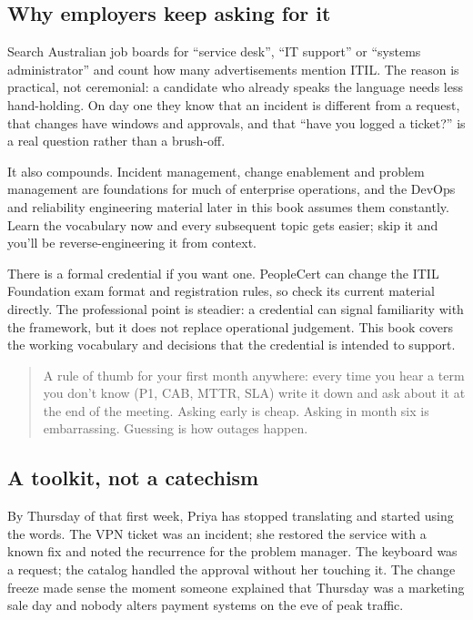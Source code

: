 \subsection{Why employers keep asking for it}


Search Australian job boards for ``service desk'', ``IT support'' or ``systems administrator'' and count how many advertisements mention ITIL. The reason is practical, not ceremonial: a candidate who already speaks the language needs less hand-holding. On day one they know that an incident is different from a request, that changes have windows and approvals, and that ``have you logged a ticket?'' is a real question rather than a brush-off.


It also compounds. Incident management, change enablement and problem management are foundations for much of enterprise operations, and the DevOps and reliability engineering material later in this book assumes them constantly. Learn the vocabulary now and every subsequent topic gets easier; skip it and you'll be reverse-engineering it from context.


There is a formal credential if you want one. PeopleCert can change the ITIL Foundation exam format and registration rules, so check its current material directly. The professional point is steadier: a credential can signal familiarity with the framework, but it does not replace operational judgement. This book covers the working vocabulary and decisions that the credential is intended to support. \autocite{peoplecert-itil4}



\begin{quote}\small
A rule of thumb for your first month anywhere: every time you hear a term you don't know (P1, CAB, MTTR, SLA) write it down and ask about it at the end of the meeting. Asking early is cheap. Asking in month six is embarrassing. Guessing is how outages happen.
\end{quote}



\subsection{A toolkit, not a catechism}


By Thursday of that first week, Priya has stopped translating and started using the words. The VPN ticket was an incident; she restored the service with a known fix and noted the recurrence for the problem manager. The keyboard was a request; the catalog handled the approval without her touching it. The change freeze made sense the moment someone explained that Thursday was a marketing sale day and nobody alters payment systems on the eve of peak traffic.


